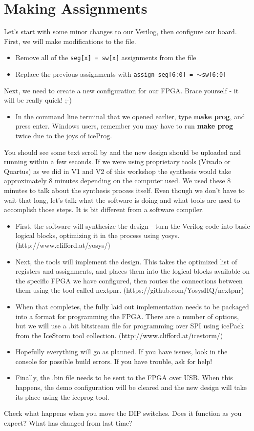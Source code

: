 \documentclass[12pt,a4paper]{article}
\begin{document}
\section{Making Assignments}
Let’s start with some minor changes to our Verilog, then configure our board. First, we will make modifications to the file. 
\begin{itemize}
	\item Remove all of the \texttt{seg[x] = sw[x]} assignments from the file 
	\item Replace the previous assignments with \texttt{assign seg[6:0] = $\sim$sw[6:0]}
\end{itemize}
\noindent
Next, we need to create a new configuration for our FPGA. Brace yourself - it will be really quick! ;-)
\begin{itemize}
	\item In the command line terminal that we opened earlier, type \textbf{make prog}, and press enter. Windows users, remember you may have to run \textbf{make prog} twice due to the joys of iceProg. 
\end{itemize}
\noindent
You should see some text scroll by and the new design should be uploaded and running within a few seconds. If we were using proprietary tools (Vivado or Quartus) as we did in V1 and V2 of this workshop the synthesis would take approximately 8 minutes depending on the computer used. We used these 8 minutes to talk about the synthesis process itself. Even though we don’t have to wait that long, let’s talk what the software is doing and what tools are used to accomplish those steps. It is bit different from a software compiler.

\begin{itemize}
	\item First, the software will synthesize the design - turn the Verilog code into basic logical blocks, optimizing it in the process using yosys. (http://www.clifford.at/yosys/)
	\item Next, the tools will implement the design. This takes the optimized list of registers and assignments, and places them into the logical blocks available on the specific FPGA we have configured, then routes the connections between them using the tool called nextpnr. (https://github.com/YosysHQ/nextpnr)
	\item When that completes, the fully laid out 	implementation needs to be packaged into a 	format for programming the FPGA. There are a 	number of options, but we will use a .bit bitstream file for programming over SPI using icePack from the IceStorm tool collection.
	(http://www.clifford.at/icestorm/)
	\item Hopefully everything will go as planned. If you have issues, look in the console for possible build errors. If you have trouble, ask for help!
	\item Finally, the .bin file needs to be sent to the FPGA over USB. When this happens, the demo configuration will be cleared and the new design will take its place using the iceprog tool.
\end{itemize}
\noindent
Check what happens when you move the DIP switches. Does it function as you expect? What has changed from last time?
\end{document}
